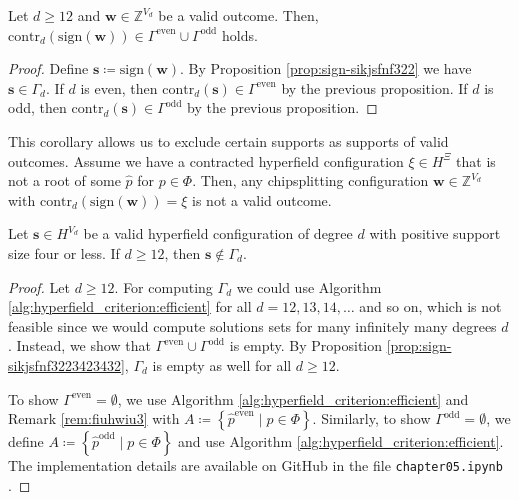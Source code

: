 \begin{corollary}\label{cor:validwunfwufneuiw}
    Let \( d \geq 12 \) and \( \mathbf{w} \in \mathbb{Z}^{V_d} \) be a valid outcome. Then, \( \mathrm{contr}_d(\mathrm{sign}(\mathbf{w})) \in \Gamma^{\mathrm{even}} \cup \Gamma^{\mathrm{odd}} \) holds.
\end{corollary}

\begin{proof}
    Define \( \mathbf{s} \coloneqq \mathrm{sign}(\mathbf{w}) \). By Proposition \ref{prop:sign-sikjsfnf322} we have \( \mathbf{s} \in \Gamma_d \). If \( d \) is even, then \( \mathrm{contr}_d(\mathbf{s}) \in \Gamma^{\mathrm{even}} \) by the previous proposition. If \( d \) is odd, then \( \mathrm{contr}_d(\mathbf{s}) \in \Gamma^{\mathrm{odd}} \) by the previous proposition.
\end{proof}

This corollary allows us to exclude certain supports as supports of valid outcomes. Assume we have a contracted hyperfield configuration \( \xi \in H^{\Xi} \) that is not a root of some \( \hat p \) for \( p \in \Phi \). Then, any chipsplitting configuration \( \mathbf{w} \in \mathbb{Z}^{V_d} \) with \( \mathrm{contr}_d( \mathrm{sign}(\mathbf{w})) = \xi \) is not a valid outcome.

\begin{proposition}\label{prop:jasndkjsnjsnkjs}
    Let \( \mathbf{s} \in H^{V_d} \) be a valid hyperfield configuration of degree \( d \) with positive support size four or less. If \( d\geq 12 \), then \( \mathbf{s} \notin \Gamma_d \).
\end{proposition}

\begin{proof}
    Let \( d \geq 12 \). For computing \( \Gamma_d \) we could use Algorithm \ref{alg:hyperfield_criterion:efficient} for all \( d = 12, 13, 14, \dots \) and so on, which is not feasible since we would compute solutions sets for many infinitely many degrees \( d \). Instead, we show that \( \Gamma^{\mathrm{even}} \cup \Gamma^{\mathrm{odd}} \) is empty. By Proposition \ref{prop:sign-sikjsfnf3223423432}, \( \Gamma_d \) is empty as well for all \( d\geq 12 \).

    To show \(  \Gamma^{\mathrm{even}} = \emptyset \), we use Algorithm \ref{alg:hyperfield_criterion:efficient} and Remark \ref{rem:fiuhwiu3} with \(A \coloneqq \left\{ \hat p^{\mathrm{even}} \mid p \in \Phi \right\}\). Similarly, to show \( \Gamma^{\mathrm{odd}} = \emptyset \), we define \(A \coloneqq \left\{ \hat p^{\mathrm{odd}} \mid p \in \Phi \right\}\) and use Algorithm \ref{alg:hyperfield_criterion:efficient}. The implementation details are available on GitHub in the file \texttt{chapter05.ipynb} \cite{ducrepo}.
\end{proof}

